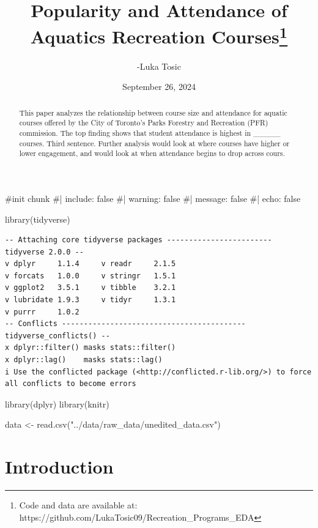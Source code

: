 \documentclass[
  letterpaper,
  DIV=11,
  numbers=noendperiod]{scrartcl}
\title{Popularity and Attendance of Aquatics Recreation
Courses\thanks{Code and data are available at:
https://github.com/LukaTosic09/Recreation\_Programs\_EDA}}
\author{-Luka Tosic}
\date{September 26, 2024}
\newenvironment{Shaded}{\begin{snugshade}}{\end{snugshade}}
\newcommand{\CommentTok}[1]{\textcolor[rgb]{0.37,0.37,0.37}{#1}}
\newcommand{\FunctionTok}[1]{\textcolor[rgb]{0.28,0.35,0.67}{#1}}
\newcommand{\NormalTok}[1]{\textcolor[rgb]{0.00,0.23,0.31}{#1}}
\newcommand{\OtherTok}[1]{\textcolor[rgb]{0.00,0.23,0.31}{#1}}
\newcommand{\StringTok}[1]{\textcolor[rgb]{0.13,0.47,0.30}{#1}}
\begin{document}
\maketitle
\begin{abstract}
This paper analyzes the relationship between course size and attendance
for aquatic courses offered by the City of Toronto's Parks Forestry and
Recreation (PFR) commission. The top finding shows that student
attendance is highest in \_\_\_\_\_ courses. Third sentence. Further
analysis would look at where courses have higher or lower engagement,
and would look at when attendance begins to drop across cours.
\end{abstract}

\begin{Shaded}
\begin{Highlighting}[]
\CommentTok{\#init chunk}
\CommentTok{\#| include: false}
\CommentTok{\#| warning: false}
\CommentTok{\#| message: false}
\CommentTok{\#| echo: false}

\FunctionTok{library}\NormalTok{(tidyverse)}
\end{Highlighting}
\end{Shaded}

\begin{verbatim}
-- Attaching core tidyverse packages ------------------------ tidyverse 2.0.0 --
v dplyr     1.1.4     v readr     2.1.5
v forcats   1.0.0     v stringr   1.5.1
v ggplot2   3.5.1     v tibble    3.2.1
v lubridate 1.9.3     v tidyr     1.3.1
v purrr     1.0.2     
-- Conflicts ------------------------------------------ tidyverse_conflicts() --
x dplyr::filter() masks stats::filter()
x dplyr::lag()    masks stats::lag()
i Use the conflicted package (<http://conflicted.r-lib.org/>) to force all conflicts to become errors
\end{verbatim}

\begin{Shaded}
\begin{Highlighting}[]
\FunctionTok{library}\NormalTok{(dplyr)}
\FunctionTok{library}\NormalTok{(knitr)}

\NormalTok{data }\OtherTok{\textless{}{-}} \FunctionTok{read.csv}\NormalTok{(}\StringTok{"../data/raw\_data/unedited\_data.csv"}\NormalTok{)}
\end{Highlighting}
\end{Shaded}

\section{Introduction}\label{introduction}
\end{document}
